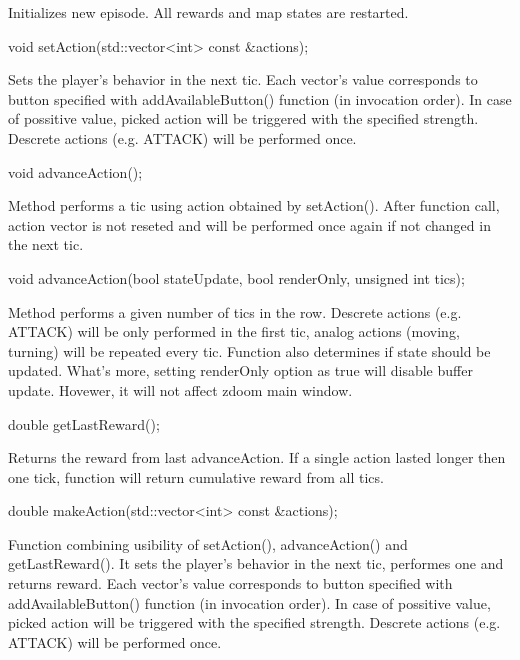 Initializes new episode. All rewards and map states are restarted.


\vspace{20pt}
\begin{clinee}
	void setAction(std::vector<int> const &actions);
\end{clinee}

Sets the player's behavior in the next tic.
Each vector's value corresponds to button specified with addAvailableButton() function (in invocation order).
In case of possitive value, picked action will be triggered with the specified strength. Descrete actions (e.g. ATTACK) will be performed once.


\vspace{20pt}
\begin{clinee}
	void advanceAction();
\end{clinee}

Method performs a tic using action obtained by setAction(). After function call, action vector is not reseted and will be performed once again if not changed in the next tic.


\vspace{20pt}
\begin{clinee}
	void advanceAction(bool stateUpdate, bool renderOnly, unsigned int tics);
\end{clinee}

Method performs a given number of tics in the row. Descrete actions (e.g. ATTACK) will be only performed in the first tic, analog actions (moving, turning) will be repeated every tic. 
Function also determines if state should be updated. What's more, setting renderOnly option as true will disable buffer update. Hovewer, it will not affect zdoom main window.  


\vspace{20pt}
\begin{clinee}
	double getLastReward();
\end{clinee}

Returns the reward from last advanceAction. If a single action lasted longer then one tick, function will return cumulative reward from all tics.


\vspace{20pt}
\begin{clinee}
	double makeAction(std::vector<int> const &actions);
\end{clinee}

Function combining usibility of setAction(), advanceAction() and getLastReward(). It sets the player's behavior in the next tic, performes one and returns reward.
Each vector's value corresponds to button specified with addAvailableButton() function (in invocation order).
In case of possitive value, picked action will be triggered with the specified strength. Descrete actions (e.g. ATTACK) will be performed once. 


